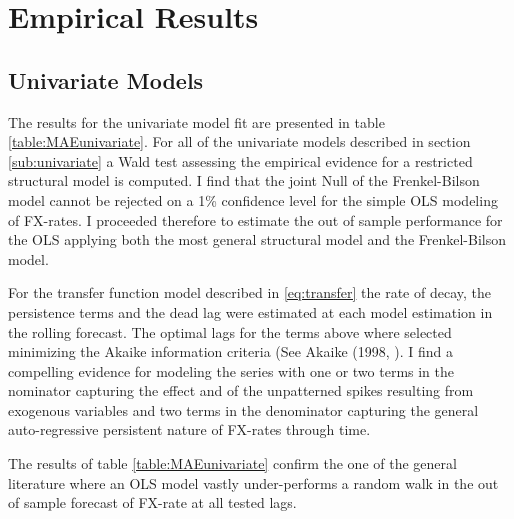 \section{Empirical Results}
\label{sec:results}

\subsection{Univariate Models}

The results for the univariate model fit are presented in table
\ref{table:MAEunivariate}.  For all of the univariate models described
in section \ref{sub:univariate} a Wald test assessing the empirical
evidence for a restricted structural model is computed. I find that
the joint Null of the Frenkel-Bilson model cannot be rejected on a 1\%
confidence level for the simple OLS modeling of FX-rates. I
proceeded therefore to estimate the out of sample performance for the
OLS applying both the most general structural model and the
Frenkel-Bilson model.

For the transfer function model described in \ref{eq:transfer} the
rate of decay, the persistence terms and the dead lag were estimated at
each model estimation in the rolling forecast. The optimal lags for
the terms above where selected minimizing the Akaike information
criteria (See Akaike (1998, \cite{Akaike}). I find a compelling
evidence for modeling the series with one or two terms in the
nominator capturing the effect and of the unpatterned spikes resulting
from exogenous variables and two terms in the denominator capturing
the general auto-regressive persistent nature of FX-rates through time.

The results of table \ref{table:MAEunivariate} confirm the one of the
general literature where an OLS model vastly under-performs a random
walk in the out of sample forecast of FX-rate at all tested lags.

